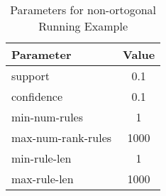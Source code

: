 \begin{table}[htbp]
	\centering
		\begin{tabular}{|l|c|}
		\hline
		\textbf{Parameter}	& \textbf{Value}	\\
		\hline
		support			& 0.1			\\
		\hline
		confidence		& 0.1			\\
		\hline
		min-num-rules		& 1			\\
		\hline
		max-num-rank-rules	& 1000			\\
		\hline
		min-rule-len		& 1			\\
		\hline
		max-rule-len		& 1000			\\
		\hline
		\end{tabular}
	\caption{Parameters for non-ortogonal Running Example}
	\label{tab:example_run_parms}
\end{table}